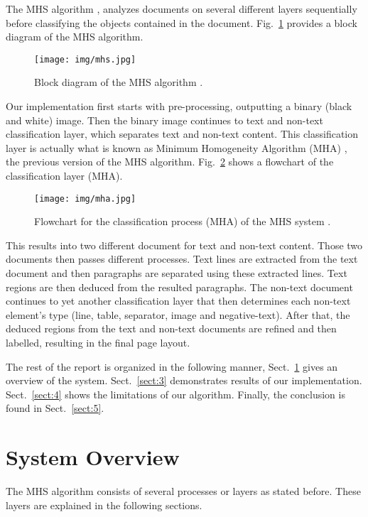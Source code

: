 \documentclass[conference]{IEEEtran}
\begin{document}
    The MHS algorithm \cite{mhs}, analyzes documents on several different layers sequentially before classifying the
    objects contained in the document. Fig.~\ref{fig:mhs} provides a block diagram of the MHS algorithm.
    \begin{figure}[htbp]
        \centerline{\texttt{[image: img/mhs.jpg]}}
        \caption{Block diagram of the MHS algorithm \cite{mhs}.}
        \label{fig:mhs}
    \end{figure}
    Our implementation first starts with pre-processing, outputting a binary (black and white) image.
    Then the binary image continues to text and non-text classification layer, which separates text and non-text
    content.
    This classification layer is actually what is known as Minimum Homogeneity Algorithm (MHA) \cite{mha}, the previous version
    of the MHS algorithm. Fig.~\ref{fig:mha} shows a flowchart of the classification layer (MHA).
    \begin{figure}[htbp]
        \centerline{\texttt{[image: img/mha.jpg]}}
        \caption{Flowchart for the classification process (MHA) of the MHS system \cite{mhs}.}
        \label{fig:mha}
    \end{figure}
    This results into two different document for text and non-text content.
    Those two documents then passes different processes.
    Text lines are extracted from the text document and then paragraphs are separated using these extracted lines.
    Text regions are then deduced from the resulted paragraphs.
    The non-text document continues to yet another classification layer that then determines each non-text element's
    type (line, table, separator, image and negative-text).
    After that, the deduced regions from the text and non-text documents are refined and then labelled, resulting in
    the final page layout.

    The rest of the report is organized in the following manner, Sect.~\ref{sect:2} gives an overview of the system.
    Sect.~\ref{sect:3} demonstrates results of our implementation.
    Sect.~\ref{sect:4} shows the limitations of our algorithm.
    Finally, the conclusion is found in Sect.~\ref{sect:5}.


    \section{System Overview}\label{sect:2}

    The MHS algorithm consists of several processes or layers as stated before.
    These layers are explained in the following sections.
\end{document}

